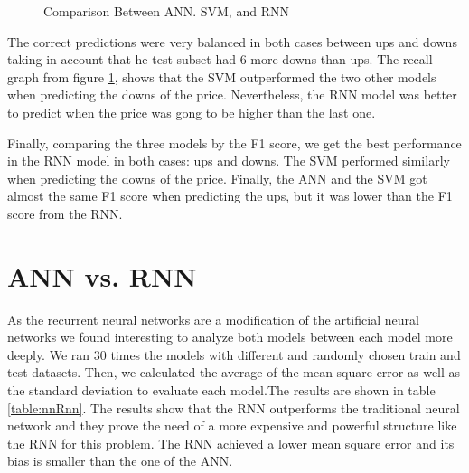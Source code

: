\begin{figure}
\center
{} 
\caption{Comparison Between ANN. SVM, and RNN}
\label{fig:comparison}
\end{figure}

The correct predictions were very balanced in both cases between ups and downs taking in account that he test subset had 6 more downs than ups. The recall graph from figure \ref{fig:comparison}, shows that the SVM outperformed the two other models when predicting the downs of the price. Nevertheless, the RNN model was better to predict when the price was gong to be higher than the last one.

Finally, comparing the three models by the F1 score, we get the best performance in the RNN model in both cases: ups and downs. The SVM performed similarly when predicting the downs of the price. Finally, the ANN and the SVM got almost the same F1 score when predicting the ups, but it was lower than the F1 score from the RNN. 

\section{ANN vs. RNN}
As the recurrent neural networks are a modification of the artificial neural networks we found interesting to analyze both models between each model more deeply. We ran 30 times the models with different and randomly chosen train and test datasets. Then, we calculated the average of the mean square error as well as the standard deviation to evaluate each model.The results are shown in table 
\ref{table:nnRnn}. The results show that the RNN outperforms the traditional neural network and they prove the need of a more expensive and powerful structure like the RNN for this problem. The RNN achieved a lower mean square error and its bias is smaller than the one of the ANN.

